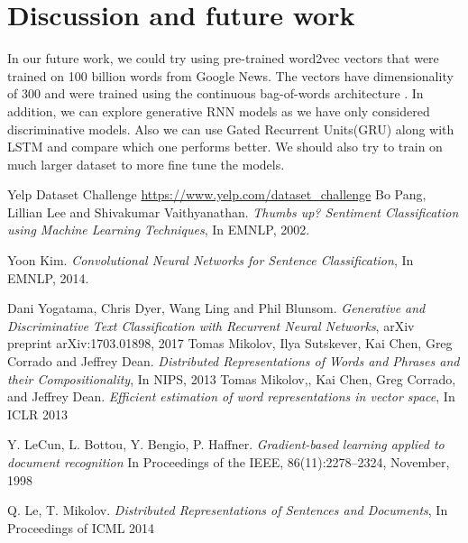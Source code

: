 \documentclass[11pt]{article}
\begin{document}
	\section{Discussion and future work}
	In our future work, we could try using pre-trained word2vec vectors that were trained on 100 billion words from Google News. The vectors have dimensionality of 300 and were trained using the continuous bag-of-words architecture \cite{miko}. In addition, we can explore generative RNN models as we have only considered discriminative models. Also we can use Gated Recurrent Units(GRU) along with LSTM and compare which one performs better. We should also try to train on much larger dataset to more fine tune the models.					
	
	\begin{thebibliography}{99}
		
		 Yelp Dataset Challenge \url{https://www.yelp.com/dataset_challenge}
		 Bo Pang, Lillian Lee and Shivakumar Vaithyanathan. \textit{Thumbs up? Sentiment Classification using Machine Learning
			Techniques}, In EMNLP, 2002.   
		
		 Yoon Kim. \textit{Convolutional Neural Networks for Sentence Classification}, In EMNLP, 2014.
		
		 Dani Yogatama, Chris Dyer, Wang Ling and Phil Blunsom. \textit{Generative and Discriminative Text Classification
			with Recurrent Neural Networks}, arXiv preprint arXiv:1703.01898, 2017
		 Tomas Mikolov, Ilya Sutskever, Kai Chen, Greg Corrado and Jeffrey Dean. \textit{Distributed Representations of Words and Phrases and their Compositionality}, In NIPS, 2013
		 Tomas Mikolov,, Kai Chen, Greg Corrado, and Jeffrey Dean. \textit{Efficient estimation of word representations in vector space}, In ICLR 2013
			
		 Y. LeCun, L. Bottou, Y. Bengio, P. Haffner. \textit{Gradient-based learning applied to document recognition}
		In Proceedings of the IEEE, 86(11):2278–2324, November, 1998 
		
		 Q. Le, T. Mikolov. \textit{Distributed Representations of Sentences and Documents}, In Proceedings of ICML 2014
		
	\end{thebibliography}
	
	\newpage
	\appendix
	
\end{document}
